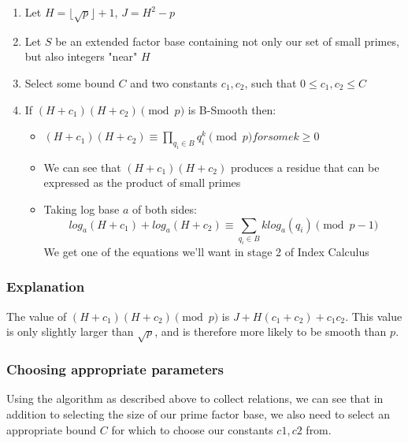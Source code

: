 \documentclass{article}
\begin{document}
        \begin{enumerate}

          \item Let $H = \lfloor\sqrt{p}\rfloor + 1$, $J = H^2 - p$

          \item Let $S$ be an extended factor base containing not only our set of small primes, but also integers "near" $H$

          \item Select some bound $C$ and two constants $c_1, c_2$, such that $0 \leq c_1, c_2 \leq C$

          \item If $(H + c_1)(H + c_2) \pmod p$ is B-Smooth then:

            \begin{itemize}
              \item $(H + c_1)(H + c_2) \equiv \prod_{q_i \in B} q_i^k \pmod p for some k \geq 0$
              \item We can see that $(H + c_1)(H + c_2)$ produces a residue that can be expressed as the product of small primes
              \item Taking log base $a$ of both sides: $$log_a(H + c_1) + log_a(H + c_2) \equiv \sum_{q_i \in B} klog_a(q_i) \pmod{p-1}$$
                We get one of the equations we'll want in stage 2 of Index Calculus
            \end{itemize}

        \end{enumerate}

        \subsubsection{Explanation}

        The value of $(H + c_1)(H + c_2)\pmod{p}$ is $J + H(c_1 + c_2) + c_1c_2$. This value is only slightly larger than $\sqrt{p}$, and is therefore more likely to be smooth than $p$.

        \subsubsection{Choosing appropriate parameters}

        Using the algorithm as described above to collect relations, we can see that in addition to selecting the size of our prime factor base, we also need to select an appropriate bound $C$ for which to choose our constants $c1, c2$ from.
\end{document}
